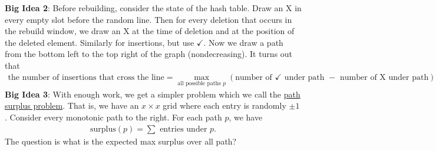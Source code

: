 \documentclass{report}
\begin{document}
\noindent \textbf{Big Idea 2}: Before rebuilding, consider the state of the hash table.
Draw an X in every empty slot before the random line. Then for every deletion that occurs in the rebuild window, we draw an X at the time of deletion and at the position of the deleted element. Similarly for insertions, but use $\checkmark$. Now we draw a path from the bottom left to the top right of the graph (nondecreasing). It turns out that 
\begin{align*}
    \text{the number of insertions that cross the line} = \max_{\text{all possible paths }p} (\text{number of $\checkmark$ under path } - \text{ number of X under path}).
\end{align*}
\noindent \textbf{Big Idea 3}: With enough work, we get a simpler problem which we call the \underline{path surplus problem}. That is, we have an $x \times x$ grid where each entry is randomly $\pm 1$. Consider every monotonic path to the right. For each path $p$, we have 
\begin{align*}
    \mathrm{surplus}(p) = \sum \text{ entries under $p$}.
\end{align*}
The question is what is the expected max surplus over all path? 
\end{document}
